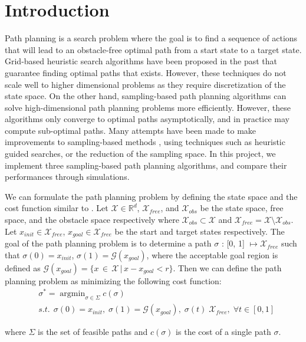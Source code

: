 \documentclass{article}
\DeclareMathOperator*{\argmin}{argmin}
\begin{document}
\section{Introduction}
Path planning is a search problem where the goal is to find a sequence of actions that will lead to an obstacle-free optimal path from a start state to a target state. Grid-based heuristic search algorithms \cite{astar} have been proposed in the past that guarantee finding optimal paths that exists. However, these techniques do not scale well to higher dimensional problems as they require discretization of the state space. On the other hand, sampling-based path planning algorithms \cite{rrt*} can solve high-dimensional path planning problems more efficiently. However, these algorithms only converge to optimal paths asymptotically, and in practice may compute sub-optimal paths. Many attempts have been made to make improvements to sampling-based methods \cite{irrt}\cite{SBA*}\cite{RA*}, using techniques such as heuristic guided searches, or the reduction of the sampling space. In this project, we implement three sampling-based path planning algorithms, and compare their performances through simulations.

We can formulate the path planning problem by defining the state space and the cost function similar to \cite{rrt*}. Let $\mathcal{X} \in \mathbb{R}^d$, $\mathcal{X}_{free}$, and $\mathcal{X}_{obs}$ be the state space, free space, and the obstacle space respectively where $\mathcal{X}_{obs} \subset \mathcal{X}$ and $\mathcal{X}_{free}  = \mathcal{X} \setminus \mathcal{X}_{obs}$. Let $x_{init} \in \mathcal{X}_{free}$, $x_{goal} \in \mathcal{X}_{free}$ be the start and target states respectively. The goal of the path planning problem is to determine a path $\sigma$ : [0, 1] $\mapsto \mathcal{X}_{free}$ such that $\sigma(0) = x_{init}$, $\sigma(1) = \mathcal{G}(x_{goal})$, where the acceptable goal region is defined as $\mathcal{G}(x_{goal}) = \{x \, \in \, \mathcal{X} \, | \, x - x_{goal} < r\}$. Then we can define the path planning problem as minimizing the following cost function:
    \begin{align}
        & \sigma^* = \argmin_{\sigma \in \Sigma} c(\sigma) \\
        & s.t. \;\, \sigma(0) = x_{init}, \; \sigma(1) = \mathcal{G}(x_{goal}), \; \sigma(t) \;  \mathcal{X}_{free}, \; \forall t \in [0,1] \nonumber
    \end{align}
    
where $\Sigma$ is the set of feasible paths and $c(\sigma)$ is the cost of a single path $\sigma$.
\end{document}

